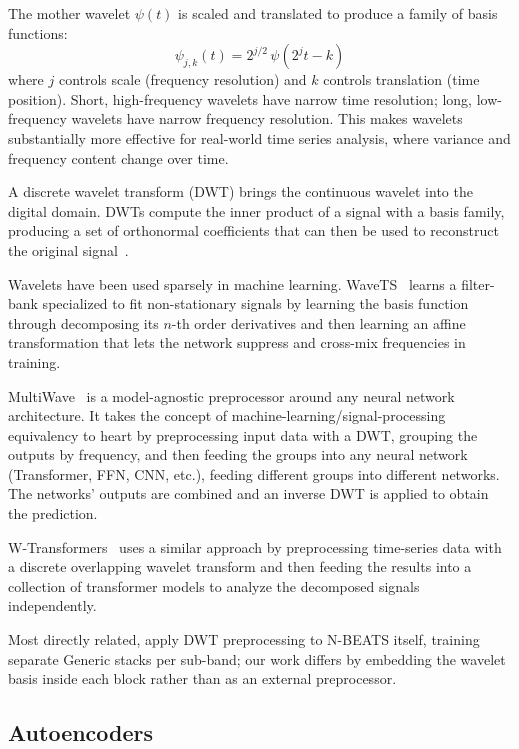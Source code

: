 \documentclass{article}
\begin{document}
The mother wavelet $\psi(t)$ is scaled and translated to produce a family of basis functions:
\begin{equation*}
\psi_{j,k}(t) = 2^{j/2}\,\psi(2^j t - k)
\end{equation*}
where $j$ controls scale (frequency resolution) and $k$ controls translation (time position). Short, high-frequency wavelets have narrow time resolution; long, low-frequency wavelets have narrow frequency resolution. This makes wavelets substantially more effective for real-world time series analysis, where variance and frequency content change over time.

A discrete wavelet transform (DWT) brings the continuous wavelet into the digital domain. DWTs compute the inner product of a signal with a basis family, producing a set of orthonormal coefficients that can then be used to reconstruct the original signal~\citep{mallat1989wavelet,daubechies1992ten}.

Wavelets have been used sparsely in machine learning. WaveTS~\citep{zhou2025wavets} learns a filter-bank specialized to fit non-stationary signals by learning the basis function through decomposing its $n$-th order derivatives and then learning an affine transformation that lets the network suppress and cross-mix frequencies in training.

MultiWave~\citep{deznabi2023multiwave} is a model-agnostic preprocessor around any neural network architecture. It takes the concept of machine-learning/signal-processing equivalency to heart by preprocessing input data with a DWT, grouping the outputs by frequency, and then feeding the groups into any neural network (Transformer, FFN, CNN, etc.), feeding different groups into different networks. The networks' outputs are combined and an inverse DWT is applied to obtain the prediction.

W-Transformers~\citep{sasal2022wtransformers} uses a similar approach by preprocessing time-series data with a discrete overlapping wavelet transform and then feeding the results into a collection of transformer models to analyze the decomposed signals independently.

Most directly related, \citet{pramanick2024fusion} apply DWT preprocessing to N-BEATS itself, training separate Generic stacks per sub-band; our work differs by embedding the wavelet basis inside each block rather than as an external preprocessor.

\subsection{Autoencoders}
\end{document}
